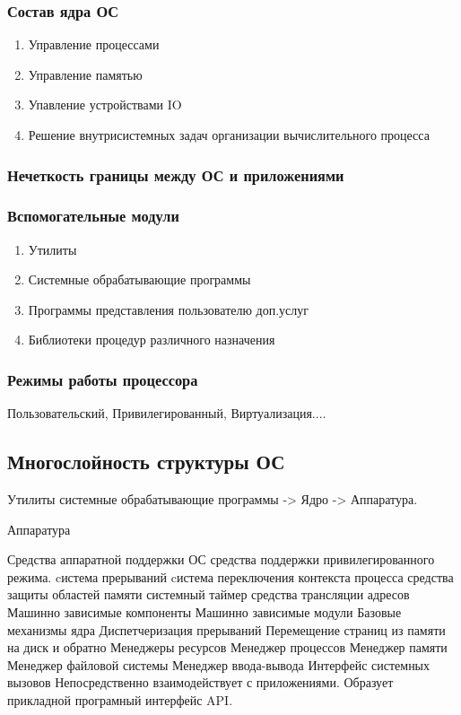 \documentclass[a4paper]{article}
\begin{document}
\subsubsection{Состав ядра ОС}
\begin{enumerate}
\item Управление процессами
\item Управление памятью
\item Упавление устройствами IO
\item Решение внутрисистемных задач организации вычислительного процесса
\end{enumerate}
\subsubsection{Нечеткость границы между ОС и приложениями}

\subsubsection{Вспомогательные модули}
\begin{enumerate}
\item Утилиты 
\item Системные обрабатывающие программы
\item Программы представления пользователю доп.услуг
\item Библиотеки процедур различного назначения
\end{enumerate}
\subsubsection{Режимы работы процессора}
    Пользовательский, Привилегированный, Виртуализация....

\subsection{Многослойность структуры ОС}
Утилиты системные обрабатывающие программы -> Ядро -> Аппаратура.

Аппаратура

Средства аппаратной поддержки ОС
    средства поддержки привилегированного режима. 
    cистема прерываний
    cистема переключения контекста процесса
    средства защиты областей памяти
    системный таймер
    средства трансляции адресов
Машинно зависимые компоненты
Машинно зависимые модули
Базовые механизмы ядра
    Диспетчеризация прерываний
    Перемещение страниц из памяти на диск и обратно
Менеджеры ресурсов
    Менеджер процессов
    Менеджер памяти
    Менеджер файловой системы
    Менеджер ввода-вывода
Интерфейс системных вызовов
    Непосредственно взаимодействует с приложениями. Образует прикладной програмный интерфейс API.
\end{document}
